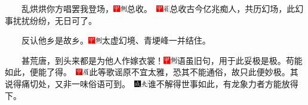 　　乱烘烘你方唱罢我登场，{\includegraphics[width=3mm]{../Images/00002}\includegraphics[width=3mm]{../Images/00011}\footnotesize 总收。　\includegraphics[width=3mm]{../Images/00002}\includegraphics[width=3mm]{../Images/00010}\footnotesize  总收古今亿兆痴人，共历幻场，此幻事扰扰纷纷，无日可了。}

　　反认他乡是故乡。{\includegraphics[width=3mm]{../Images/00002}\includegraphics[width=3mm]{../Images/00011}\footnotesize 太虚幻境、青埂峰一并结住。}

　　甚荒唐，到头来都是为他人作嫁衣裳！{{\includegraphics[width=3mm]{../Images/00002}\includegraphics[width=3mm]{../Images/00011}\footnotesize 语虽旧句，用于此妥极是极。苟能如此，便能了得。　\includegraphics[width=3mm]{../Images/00002}\includegraphics[width=3mm]{../Images/00010}\footnotesize  此等歌谣原不宜太雅，恐其不能通俗，故只此便妙极。其说得痛切处，又非一味俗语可到。　}\includegraphics[width=3mm]{../Images/00005}\includegraphics[width=3mm]{../Images/00012}\footnotesize   谁不解得世事如此，有龙象力者方能放得下。}

